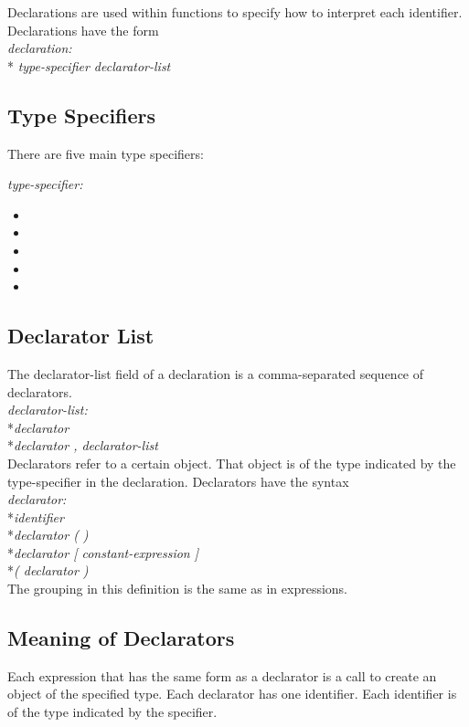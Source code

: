 Declarations are used within functions to specify how to interpret each identifier. Declarations have the form\\

	\textit{ declaration: }
		\\*\indent\indent\textit{ type-specifier declarator-list}

\subsection{Type Specifiers}

There are five main type specifiers:

	\textit{type-specifier: }
\begin{itemize}[~]
  \item \integ
  \item \float
  \item \complex
  \item \mat
  \item \qubit
\end{itemize}

\subsection{ Declarator List }
The declarator-list field of a declaration is a comma-separated sequence of declarators.\\

	\textit{declarator-list:}
		\\*\indent\indent\textit{declarator}
		\\*\indent\indent\textit{declarator , declarator-list}\\

Declarators refer to a certain object. That object is of the type indicated by the type-specifier in the declaration. Declarators have the syntax\\

	\textit{declarator:}
		\\*\indent\indent\textit{identifier}
		\\*\indent\indent\textit{declarator ( )}
		\\*\indent\indent\textit{declarator [ constant-expression ]}
		\\*\indent\indent\textit{( declarator )}\\

The grouping in this definition is the same as in expressions.				

\subsection{ Meaning of Declarators }
Each expression that has the same form as a declarator is a call to create an object of the specified type. Each declarator has one identifier. Each identifier is of the type indicated by the specifier.\\

